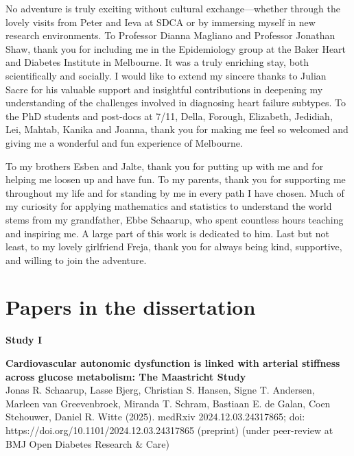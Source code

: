 \documentclass[
  letterpaper,
  headsepline=true,
  open=any]{scrbook}
\begin{document}
No adventure is truly exciting without cultural exchange---whether
through the lovely visits from Peter and Ieva at SDCA or by immersing
myself in new research environments. To Professor Dianna Magliano and
Professor Jonathan Shaw, thank you for including me in the Epidemiology
group at the Baker Heart and Diabetes Institute in Melbourne. It was a
truly enriching stay, both scientifically and socially. I would like to
extend my sincere thanks to Julian Sacre for his valuable support and
insightful contributions in deepening my understanding of the challenges
involved in diagnosing heart failure subtypes. To the PhD students and
post-docs at 7/11, Della, Forough, Elizabeth, Jedidiah, Lei, Mahtab,
Kanika and Joanna, thank you for making me feel so welcomed and giving
me a wonderful and fun experience of Melbourne.

To my brothers Esben and Jalte, thank you for putting up with me and for
helping me loosen up and have fun. To my parents, thank you for
supporting me throughout my life and for standing by me in every path I
have chosen. Much of my curiosity for applying mathematics and
statistics to understand the world stems from my grandfather, Ebbe
Schaarup, who spent countless hours teaching and inspiring me. A large
part of this work is dedicated to him. Last but not least, to my lovely
girlfriend Freja, thank you for always being kind, supportive, and
willing to join the adventure.


\hypertarget{sec-linked-papers}{%
\chapter*{Papers in the dissertation}\label{sec-linked-papers}}


\textbf{Study I}

\textbf{Cardiovascular autonomic dysfunction is linked with arterial
stiffness across glucose metabolism: The Maastricht Study}\\
Jonas R. Schaarup, Lasse Bjerg, Christian S. Hansen, Signe T. Andersen,
Marleen van Greevenbroek, Miranda T. Schram, Bastiaan E. de Galan, Coen
Stehouwer, Daniel R. Witte (2025). medRxiv 2024.12.03.24317865; doi:
https://doi.org/10.1101/2024.12.03.24317865 (preprint) (under
peer-review at BMJ Open Diabetes Research \& Care)
\end{document}
